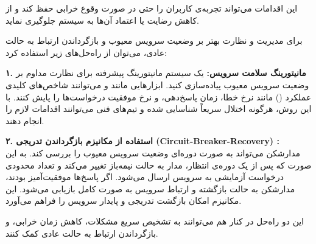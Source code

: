 	این اقدامات می‌تواند تجربه‌ی کاربران را حتی در صورت وقوع خرابی حفظ کند و از کاهش رضایت یا اعتماد آن‌ها به سیستم جلوگیری نماید.




	برای مدیریت و نظارت بهتر بر وضعیت سرویس معیوب و بازگرداندن ارتباط به حالت عادی، می‌توان از راه‌حل‌های زیر استفاده کرد:
	
	\textbf{۱. مانیتورینگ سلامت سرویس:} 
	یک سیستم مانیتورینگ پیشرفته برای نظارت مداوم بر وضعیت سرویس معیوب پیاده‌سازی کنید. ابزارهایی مانند  و  می‌توانند شاخص‌های کلیدی عملکرد () مانند نرخ خطا، زمان پاسخ‌دهی، و نرخ موفقیت درخواست‌ها را پایش کنند. با این روش، هرگونه اختلال سریعاً شناسایی شده و تیم‌های فنی می‌توانند اقدامات لازم را انجام دهند.
	
	\textbf{۲. استفاده از مکانیزم بازگرداندن تدریجی (Circuit-Breaker-Recovery) :} 
	مدارشکن می‌تواند به صورت دوره‌ای وضعیت سرویس معیوب را بررسی کند. به این صورت که پس از یک دوره‌ی انتظار، مدار به حالت نیمه‌باز تغییر می‌کند و تعداد محدودی درخواست آزمایشی به سرویس ارسال می‌شود. اگر پاسخ‌ها موفقیت‌آمیز بودند، مدارشکن به حالت بازگشته و ارتباط سرویس به صورت کامل بازیابی می‌شود. این مکانیزم امکان بازگشت تدریجی و پایدار سرویس را فراهم می‌آورد.
	
	این دو راه‌حل در کنار هم می‌توانند به تشخیص سریع مشکلات، کاهش زمان خرابی، و بازگرداندن ارتباط به حالت عادی کمک کنند.

